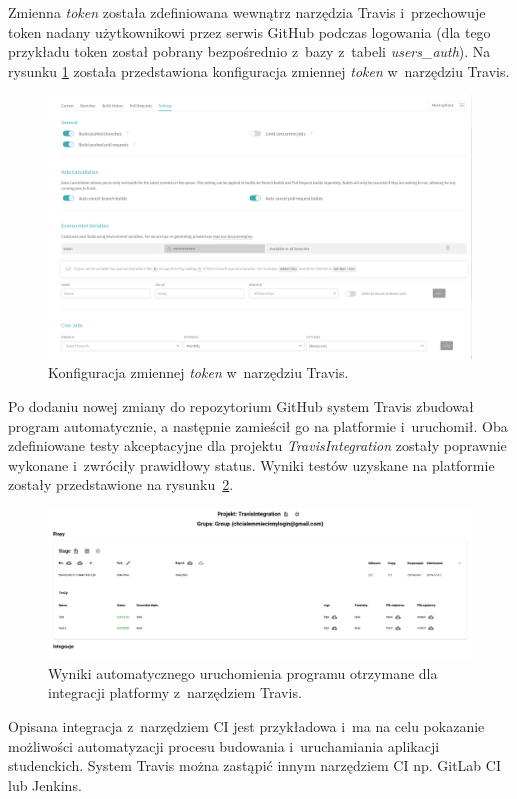Zmienna \textit{token} została zdefiniowana wewnątrz narzędzia Travis i~przechowuje token nadany użytkownikowi przez serwis GitHub podczas logowania (dla tego przykładu token został pobrany bezpośrednio z~bazy z~tabeli \textit{users\_auth}).
Na rysunku \ref{fig:travis_integration_internal} została przedstawiona konfiguracja zmiennej \textit{token} w~narzędziu Travis.

\begin{figure}[h]
    \centering
    \includegraphics[width = 12cm]{chapter05/travis_integration_internal.png}
    \caption{Konfiguracja zmiennej \textit{token} w~narzędziu Travis.}
    \label{fig:travis_integration_internal}
\end{figure}

Po dodaniu nowej zmiany do repozytorium GitHub system Travis zbudował program automatycznie, a następnie zamieścił go na platformie i~uruchomił.
Oba zdefiniowane testy akceptacyjne dla projektu \textit{TravisIntegration} zostały poprawnie wykonane i~zwróciły prawidłowy status.
Wyniki testów uzyskane na platformie zostały przedstawione na rysunku~\ref{fig:travis_integration_result}.

\begin{figure}[h]
    \centering
    \includegraphics[width = 12cm]{chapter05/travis_integration_result.png}
    \caption{Wyniki automatycznego uruchomienia programu otrzymane dla integracji platformy z~narzędziem Travis.}
    \label{fig:travis_integration_result}
\end{figure}

Opisana integracja z~narzędziem CI jest przykładowa i~ma na celu pokazanie możliwości automatyzacji procesu budowania i~uruchamiania aplikacji studenckich.
System Travis można zastąpić innym narzędziem CI np. GitLab CI lub Jenkins.